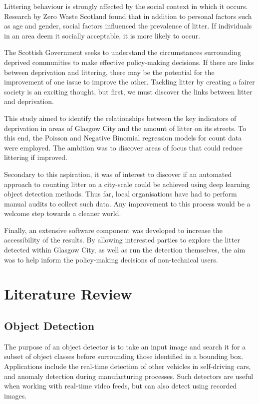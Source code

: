 \documentclass{thesis}
\begin{document}
Littering behaviour is strongly affected by the social context in which it occurs\cite{littering-behaviour}. Research by Zero Waste Scotland found that in addition to personal factors such as age and gender, social factors influenced the prevalence of litter. If individuals in an area deem it socially acceptable, it is more likely to occur. 

The Scottish Government seeks to understand the circumstances surrounding deprived communities to make effective policy-making decisions. If there are links between deprivation and littering, there may be the potential for the improvement of one issue to improve the other. Tackling litter by creating a fairer society is an exciting thought, but first, we must discover the links between litter and deprivation.

This study aimed to identify the relationships between the key indicators of deprivation in areas of Glasgow City and the amount of litter on its streets. To this end, the Poisson and Negative Binomial regression models for count data were employed. The ambition was to discover areas of focus that could reduce littering if improved.

Secondary to this aspiration, it was of interest to discover if an automated approach to counting litter on a city-scale could be achieved using deep learning object detection methods. Thus far, local organisations have had to perform manual audits to collect such data. Any improvement to this process would be a welcome step towards a cleaner world.

Finally, an extensive software component was developed to increase the accessibility of the results. By allowing interested parties to explore the litter detected within Glasgow City, as well as run the detection themselves, the aim was to help inform the policy-making decisions of non-technical users.


\chapter{Literature Review}

\section{Object Detection}

The purpose of an object detector is to take an input image and search it for a subset of object classes before surrounding those identified in a bounding box. Applications include the real-time detection of other vehicles in self-driving cars, and anomaly detection during manufacturing processes. Such detectors are useful when working with real-time video feeds, but can also detect using recorded images. 
\end{document}
